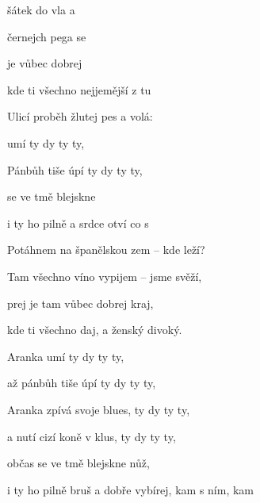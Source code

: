 

\zs
{} šátek {do} vla a 

 černejch pega se 

 je vůbec dobrej 

kde ti všechno  nejjemější z  tu 
\ks

\zs
Ulicí proběh žlutej pes a volá:

\ks

\zr
{} umí  ty dy ty ty,

 Pánbůh tiše úpí  ty dy ty ty,

 se ve tmě blejskne 

i ty ho pilně  a srdce otví co s 
\kr

\zs
Potáhnem na španělskou zem -- kde leží?

Tam všechno víno vypijem -- jsme svěží,

prej je tam vůbec dobrej kraj,

kde ti všechno daj, a ženský divoký.
\ks

\zr
Aranka umí  ty dy ty ty,

až pánbůh tiše úpí  ty dy ty ty,

Aranka zpívá svoje blues, ty dy ty ty,

a nutí cizí koně v klus, ty dy ty ty,

občas se ve tmě blejskne nůž,

i ty ho pilně bruš a dobře vybírej, kam s ním,  kam 
\kr

\kp





